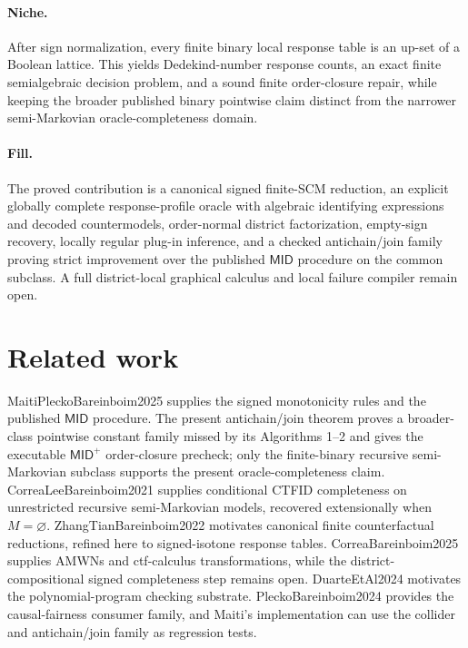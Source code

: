 \documentclass{article}
\begin{document}
\paragraph{Niche.} After sign normalization, every finite binary local response table is an up-set of a Boolean lattice.  This yields Dedekind-number response counts, an exact finite semialgebraic decision problem, and a sound finite order-closure repair, while keeping the broader published binary pointwise claim distinct from the narrower semi-Markovian oracle-completeness domain.

\paragraph{Fill.} The proved contribution is a canonical signed finite-SCM reduction, an explicit globally complete response-profile oracle with algebraic identifying expressions and decoded countermodels, order-normal district factorization, empty-sign recovery, locally regular plug-in inference, and a checked antichain/join family proving strict improvement over the published \(\mathsf{MID}\) procedure on the common subclass.  A full district-local graphical calculus and local failure compiler remain open.

\section{Related work}

MaitiPleckoBareinboim2025 supplies the signed monotonicity rules and the published \(\mathsf{MID}\) procedure.  The present antichain/join theorem proves a broader-class pointwise constant family missed by its Algorithms 1--2 and gives the executable \(\mathsf{MID}^{+}\) order-closure precheck; only the finite-binary recursive semi-Markovian subclass supports the present oracle-completeness claim.  CorreaLeeBareinboim2021 supplies conditional CTFID completeness on unrestricted recursive semi-Markovian models, recovered extensionally when \(M=\varnothing\).  ZhangTianBareinboim2022 motivates canonical finite counterfactual reductions, refined here to signed-isotone response tables.  CorreaBareinboim2025 supplies AMWNs and ctf-calculus transformations, while the district-compositional signed completeness step remains open.  DuarteEtAl2024 motivates the polynomial-program checking substrate.  PleckoBareinboim2024 provides the causal-fairness consumer family, and Maiti's implementation can use the collider and antichain/join family as regression tests.
\end{document}
